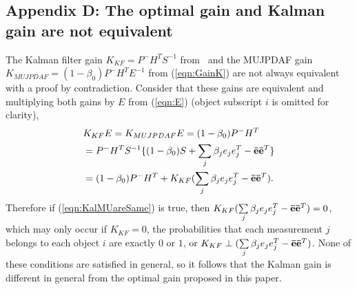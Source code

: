 \documentclass[letterpaper, paper,10pt]{AAS}		%
\newcommand{\refeqn}[1]{(\ref{eqn:#1})}
\begin{document}
\begin{appendix}
\subsection{Appendix D: The optimal gain and Kalman gain are not equivalent}
The Kalman filter gain $K_{KF}=P^-H^TS^{-1}$ from~\cite{TrackDataAssoc} and the MUJPDAF gain $K_{MUJPDAF}=(1-\beta_{0})P^-H^TE^{-1}$ from \refeqn{GainK} are not always equivalent with a proof by contradiction.
Consider that these gains are equivalent and multiplying both gains by $E$ from \refeqn{E} (object subscript $i$ is omitted for clarity),
\begin{align}
&K_{KF}E=K_{MUJPDAF}E=(1-\beta_{0})P^-H^T\nonumber
\\
&=P^-H^TS^{-1}\{(1-\beta_{0})S+{\sum\limits_{j} \beta_{j}e_{j}e_{j}^T-{\bf\bar{e}}}{\bf\bar{e}}^T\}\nonumber
\\
&=(1-\beta_{0})P^-H^T+K_{KF}({\sum\limits_{j} \beta_{j}e_{j}e_{j}^T-{\bf\bar{e}}}{\bf\bar{e}}^T).\label{eqn:KalMUareSame}
\end{align}
Therefore if \refeqn{KalMUareSame} is true, then $K_{KF}({\sum\limits_{j} \beta_{j}e_{j}e_{j}^T-{\bf\bar{e}}}{\bf\bar{e}}^T)=0$, which
may only occur if $K_{KF}=0$, the probabilities that each measurement $j$ belongs to each object $i$ are exactly $0$ or $1$, or $K_{KF}\perp({\sum\limits_{j} \beta_{j}e_{j}e_{j}^T-{\bf\bar{e}}}{\bf\bar{e}}^T)$.
None of these conditions are satisfied in general, so it follows that the Kalman gain is different in general from the optimal gain proposed in this paper.

\end{appendix}
\end{document}
